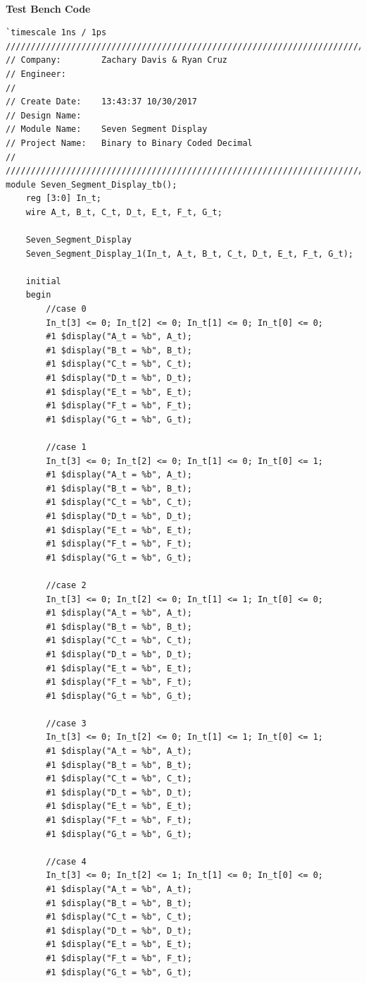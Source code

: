 \documentclass[12pt]{report}
\begin{document}
				\paragraph*{}
			
		\vspace{1cm}

	\textbf{Test Bench Code}
			\begin{Verbatim}[frame=single, fontsize=\small]
`timescale 1ns / 1ps
////////////////////////////////////////////////////////////////////////////////
// Company:        Zachary Davis & Ryan Cruz
// Engineer: 
// 
// Create Date:    13:43:37 10/30/2017 
// Design Name:    
// Module Name:    Seven Segment Display
// Project Name:   Binary to Binary Coded Decimal
//
////////////////////////////////////////////////////////////////////////////////
module Seven_Segment_Display_tb();
	reg [3:0] In_t;
	wire A_t, B_t, C_t, D_t, E_t, F_t, G_t;
	
	Seven_Segment_Display 
	Seven_Segment_Display_1(In_t, A_t, B_t, C_t, D_t, E_t, F_t, G_t);
	
	initial
	begin
		//case 0
		In_t[3] <= 0; In_t[2] <= 0; In_t[1] <= 0; In_t[0] <= 0;
		#1 $display("A_t = %b", A_t);
		#1 $display("B_t = %b", B_t);
		#1 $display("C_t = %b", C_t);
		#1 $display("D_t = %b", D_t);
		#1 $display("E_t = %b", E_t);
		#1 $display("F_t = %b", F_t);
		#1 $display("G_t = %b", G_t);
		
		//case 1
		In_t[3] <= 0; In_t[2] <= 0; In_t[1] <= 0; In_t[0] <= 1;
		#1 $display("A_t = %b", A_t);
		#1 $display("B_t = %b", B_t);
		#1 $display("C_t = %b", C_t);
		#1 $display("D_t = %b", D_t);
		#1 $display("E_t = %b", E_t);
		#1 $display("F_t = %b", F_t);
		#1 $display("G_t = %b", G_t);
		
		//case 2
		In_t[3] <= 0; In_t[2] <= 0; In_t[1] <= 1; In_t[0] <= 0;
		#1 $display("A_t = %b", A_t);
		#1 $display("B_t = %b", B_t);
		#1 $display("C_t = %b", C_t);
		#1 $display("D_t = %b", D_t);
		#1 $display("E_t = %b", E_t);
		#1 $display("F_t = %b", F_t);
		#1 $display("G_t = %b", G_t);
		
		//case 3
		In_t[3] <= 0; In_t[2] <= 0; In_t[1] <= 1; In_t[0] <= 1;
		#1 $display("A_t = %b", A_t);
		#1 $display("B_t = %b", B_t);
		#1 $display("C_t = %b", C_t);
		#1 $display("D_t = %b", D_t);
		#1 $display("E_t = %b", E_t);
		#1 $display("F_t = %b", F_t);
		#1 $display("G_t = %b", G_t);
		
		//case 4
		In_t[3] <= 0; In_t[2] <= 1; In_t[1] <= 0; In_t[0] <= 0;
		#1 $display("A_t = %b", A_t);
		#1 $display("B_t = %b", B_t);
		#1 $display("C_t = %b", C_t);
		#1 $display("D_t = %b", D_t);
		#1 $display("E_t = %b", E_t);
		#1 $display("F_t = %b", F_t);
		#1 $display("G_t = %b", G_t);
		

\end{Verbatim}
\end{document}
